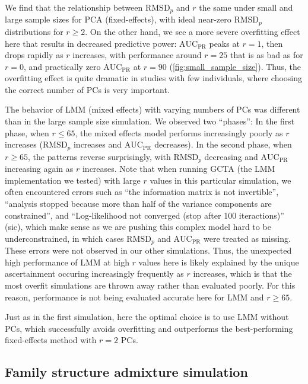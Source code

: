\documentclass[11pt]{article}
\newcommand{\rmsd}{\text{RMSD}_p}
\newcommand{\auc}{\text{AUC}_\text{PR}}
\begin{document}
We find that the relationship between $\rmsd$ and $r$ the same under small and large sample sizes for PCA (fixed-effects), with ideal near-zero $\rmsd$ distributions for $r \ge 2$.
On the other hand, we see a more severe overfitting effect here that results in decreased predictive power: $\auc$ peaks at $r = 1$, then drops rapidly as $r$ increases, with performance around $r = 25$ that is as bad as for $r = 0$, and practically zero $\auc$ at $r = 90$ (\cref{fig:small_sample_size}).
Thus, the overfitting effect is quite dramatic in studies with few individuals, where choosing the correct number of PCs is very important.

The behavior of LMM (mixed effects) with varying numbers of PCs was different than in the large sample size simulation.
We observed two ``phases'':
In the first phase, when $r \le 65$, the mixed effects model performs increasingly poorly as $r$ increases ($\rmsd$ increases and $\auc$ decreases).
In the second phase, when $r \ge 65$, the patterns reverse surprisingly, with $\rmsd$ decreasing and $\auc$ increasing again as $r$ increases.
Note that when running GCTA (the LMM implementation we tested) with large $r$ values in this particular simulation, we often encountered errors such as ``the information matrix is not invertible'', ``analysis stopped because more than half of the variance components are constrained'', and ``Log-likelihood not converged (stop after 100 iteractions)'' (sic), which make sense as we are pushing this complex model hard to be underconstrained, in which cases $\rmsd$ and $\auc$ were treated as missing.
These errors were not observed in our other simulations.
Thus, the unexpected high performance of LMM at high $r$ values here is likely explained by the unique ascertainment occuring increasingly frequently as $r$ increases, which is that the most overfit simulations are thrown away rather than evaluated poorly.
For this reason, performance is not being evaluated accurate here for LMM and $r \ge 65$.

Just as in the first simulation, here the optimal choice is to use LMM without PCs, which successfully avoids overfitting and outperforms the best-performing fixed-effects method with $r=2$ PCs.



\subsection{Family structure admixture simulation}
\end{document}
